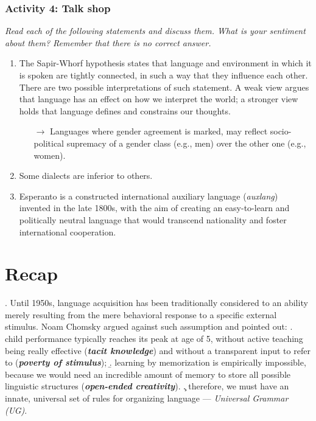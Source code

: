 \documentclass[11pt, oneside]{article}   	%
\begin{document}
\subsubsection{Activity 4: Talk shop}

{\itshape Read each of the following statements and discuss them. What is your sentiment about them? Remember that there is no correct answer.}

\begin{enumerate}
\item The Sapir-Whorf hypothesis states that language and environment in which it is spoken are tightly connected, in such a way that they influence each other. There are two possible interpretations of such statement. A weak view argues that language has an effect on how we interpret the world; a stronger view holds that language defines and constrains our thoughts. 
	
	\begin{enumerate}
		\item[$\rightarrow$] Languages where gender agreement is marked, may reflect socio-political suprema\-cy of a gender class (e.g., men) over the other one (e.g., women).
	\end{enumerate}

\item Some dialects are inferior to others.
\item Esperanto is a constructed international auxiliary language ({\itshape auxlang}) invented in the late 1800s, with the aim of creating an easy-to-learn and politically neutral language that would transcend nationality and foster international cooperation.
\end{enumerate}

\section{Recap}

\ex. Until 1950s, language acquisition has been traditionally considered to an ability merely resulting from the mere behavioral response to a specific external stimulus. Noam Chomsky argued against such assumption and pointed out:
\a. child performance typically reaches its peak at age of 5, without active teaching being really effective ({\itshape \bfseries tacit knowledge}) and without a transparent input to refer to ({\itshape \bfseries poverty of stimulus});
\b. learning by memorization is empirically impossible, because we would need an incredible amount of memory to store all possible linguistic structures ({\itshape \bfseries open-ended creativity}).
\c. therefore, we must have an innate, universal set of rules for organizing language --- {\itshape Universal Grammar (UG)}.
\end{document}
